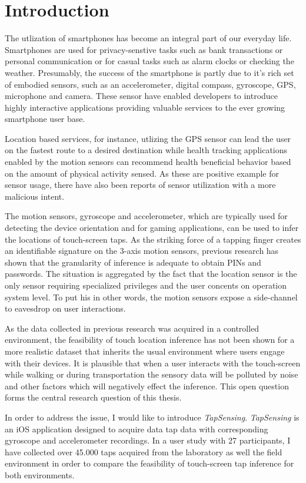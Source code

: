 \chapter{Introduction\label{cha:chapter1}}
The utlization of smartphones has become an integral part of our everyday life. Smartphones are used for privacy-senstive tasks such as bank transactions or personal communication or for casual tasks such as alarm clocks or checking the weather. Presumably, the success of the smartphone is partly due to it's rich set of embodied sensors, such as an accelerometer, digital compass, gyroscope, GPS, microphone and camera. These sensor have enabled developers to introduce highly interactive applications providing valuable services to the ever growing smartphone user base.

Location based services, for instance, utlizing the GPS sensor can lead the user on the fastest route to a desired destination while health tracking applications enabled by the motion sensors can recommend health beneficial behavior based on the amount of physical activity sensed. As these are positive example for sensor usage, there have also been reports of sensor utilization with a more malicious intent.

The motion sensors, gyroscope and accelerometer, which are typically used for detecting the device orientation and for gaming applications, can be used to infer the locations of touch-screen taps. As the striking force of a tapping finger creates an identifiable signature on the 3-axis motion sensors, previous research has shown that the granularity of inference is adequate to obtain PINs and passwords. The situation is aggregated by the fact that the location sensor is the only sensor requiring specialized privileges and the user concents on operation system level. To put his in other words, the motion sensors expose a side-channel to eavesdrop on user interactions.

As the data collected in previous research was acquired in a controlled environment, the feasibility of touch location inference has not been shown for a more realistic dataset that inherits the usual environment where users engage with their devices. It is plausible that when a user interacts with the touch-screen while walking or during transportation the sensory data will be polluted by noise and other factors which will negatively effect the inference. This open question forms the central research question of this thesis.

In order to address the issue, I would like to introduce \textit{TapSensing}. \textit{TapSensing} is an iOS application designed to acquire data tap data with corresponding gyroscope and accelerometer recordings. In a user study with 27 participants, I have collected over 45.000 taps acquired from the laboratory as well the field environment in order to compare the feasibility of touch-screen tap inference for both environments.

